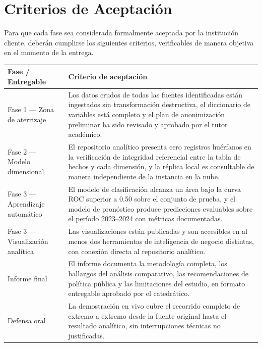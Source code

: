 \documentclass[12pt,a4paper]{article}
\begin{document}
\newpage
\section{Criterios de Aceptación}

Para que cada fase sea considerada formalmente aceptada por la institución cliente, deberán
cumplirse los siguientes criterios, verificables de manera objetiva en el momento de la entrega.

\vspace{6pt}
{\small
\begin{tabularx}{\linewidth}{@{} l X @{}}
  \toprule
  \textbf{Fase / Entregable} & \textbf{Criterio de aceptación} \\
  \midrule
  Fase 1 — Zona de aterrizaje
    & Los datos crudos de todas las fuentes identificadas están ingestados sin
      transformación destructiva, el diccionario de variables está completo y el plan de
      anonimización preliminar ha sido revisado y aprobado por el tutor académico. \\[5pt]
  Fase 2 — Modelo dimensional
    & El repositorio analítico presenta cero registros huérfanos en la verificación de
      integridad referencial entre la tabla de hechos y cada dimensión, y la réplica local
      es consultable de manera independiente de la instancia en la nube. \\[5pt]
  Fase 3 — Aprendizaje automático
    & El modelo de clasificación alcanza un área bajo la curva ROC superior a 0.50 sobre
      el conjunto de prueba, y el modelo de pronóstico produce predicciones evaluables
      sobre el período 2023--2024 con métricas documentadas. \\[5pt]
  Fase 3 — Visualización analítica
    & Las visualizaciones están publicadas y son accesibles en al menos dos herramientas
      de inteligencia de negocio distintas, con conexión directa al repositorio analítico. \\[5pt]
  Informe final
    & El informe documenta la metodología completa, los hallazgos del análisis comparativo,
      las recomendaciones de política pública y las limitaciones del estudio, en formato
      entregable aprobado por el catedrático. \\[5pt]
  Defensa oral
    & La demostración en vivo cubre el recorrido completo de extremo a extremo desde la
      fuente original hasta el resultado analítico, sin interrupciones técnicas no
      justificadas. \\
  \bottomrule
\end{tabularx}
}
\end{document}
